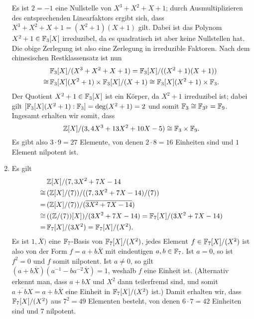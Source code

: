 \begin{solution}
\begin{enumerate}
      Es ist $2 = -1$ eine Nullstelle von $X^3 + X^2 + X + 1$; durch Ausmultiplizieren des entsprechenden Linearfaktors ergibt sich, dass $X^3 + X^2 + X + 1 = (X^2 + 1)(X + 1)$ gilt.
      Dabei ist das Polynom $X^2 + 1 \in \mathbb{F}_3[X]$ irreduzibel, da es quadratisch ist aber keine Nullstellen hat.
      Die obige Zerlegung ist also eine Zerlegung in irreduzible Faktoren.
      Nach dem chinesischen Restklassensatz ist nun
      \begin{align*}
             &\,  \mathbb{F}_3[X]/(X^3 + X^2 + X + 1)
            =     \mathbb{F}_3[X]/( (X^2 + 1)(X + 1) )
        \\
        \cong&\,  \mathbb{F}_3[X](X^2 + 1) \times \mathbb{F}_3[X]/(X+1)
        \cong     \mathbb{F}_3[X](X^2 + 1) \times \mathbb{F}_3.
      \end{align*}
      Der Quotient $X^2 + 1 \in \mathbb{F}_3[X]$ ist ein Körper, da $X^2 + 1$ irreduzibel ist; dabei gilt $[\mathbb{F}_3[X](X^2 + 1) : \mathbb{F}_3] = \deg (X^2 + 1) = 2$ und somit $\mathbb{F}_3 \cong \mathbb{F}_{3^2} = \mathbb{F}_9$.
      Ingesamt erhalten wir somit, dass
      \[
              \mathbb{Z}[X]/(3, 4 X^3 + 13 X^2 + 10 X - 5)
        \cong \mathbb{F}_3 \times \mathbb{F}_9.
      \]
      Es gibt also $3 \cdot 9 = 27$ Elemente, von denen $2 \cdot 8 = 16$ Einheiten sind und $1$ Element nilpotent ist.
    
    \item
      Es gilt
      \begin{align*}
             &\,  \mathbb{Z}[X]/(7, 3 X^2 + 7X - 14
        \\
        \cong&\,  ( \mathbb{Z}[X]/(7) ) / ( (7, 3 X^2 + 7X - 14 ) / (7) )
        \\
            =&\,  ( \mathbb{Z}[X]/(7) ) / ( \overline{3 X^2 + 7X - 14} )
        \\
        \cong&\,  ( (\mathbb{Z}/(7))[X] ) / (3 X^2 + 7X - 14)
            =     \mathbb{F}_7[X] / (3 X^2 + 7 X - 14)
        \\
            =&\,   \mathbb{F}_7[X] / (3 X^2)
            =     \mathbb{F}_7[X] / (X^2).
      \end{align*}
      Es ist $1, \overline{X})$ eine $\mathbb{F}_7$-Basis von $\mathbb{F}_7[X]/(X^2)$, jedes Element $f \in \mathbb{F}_7[X]/(X^2)$ ist also von der Form $f = a + b \overline{X}$ mit eindeutigen $a, b \in \mathbb{F}_7$.
      Ist $a = 0$, so ist $f^2 = 0$ und $f$ somit nilpotent.
      Ist $a \neq 0$, so gilt $(a + b\overline{X}) (a^{-1} - b a^{-2} \overline{X}) = 1$, weshalb $f$ eine Einheit ist.
      (Alternativ erkennt man, dass $a + b X$ und $X^2$ dann teilerfremd sind, und somit $\overline{a + b X} = a + b \overline{X}$ eine Einheit in $\mathbb{F}_7[X]/(X^2)$ ist.)
      Damit erhalten wir, dass $\mathbb{F}_7[X]/(X^2)$ aus $7^2 = 49$ Elementen besteht, von denen $6 \cdot 7 = 42$ Einheiten sind und $7$ nilpotent.
  \end{enumerate}
\end{solution}


